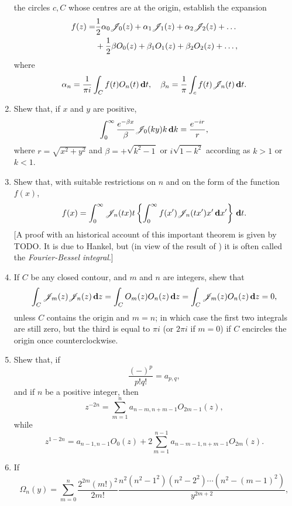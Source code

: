 \begin{enumerate}
  the circles $c,C$ whose centres are at the origin, establish the
  expansion
  \begin{align*}
    f(z)
    =&
    \frac{1}{2} \alpha_{0} \mathscr{J}_{0}(z) + \alpha_{1} \mathscr{J}_{1}(z)
    + \alpha_{2} \mathscr{J}_{2}(z) + \dots
    \\
    &
    + \frac{1}{2} \beta O_{0}(z) + \beta_{1} O_{1}(z) + \beta_{2} O_{2}(z) + \dots,
  \end{align*}
  where
  $$
  \alpha_{n}
  =
  \frac{1}{\pi i}
  \int_{C} f(t) O_{n}(t) \, \mathbf{d} t,
  \quad
  \beta_{n}
  =
  \frac{1}{\pi}
  \int_{c} f(t) \mathscr{J}_{n}(t) \, \mathbf{d} t.
  $$
\item
  Shew that, if $x$ and $y$ are positive,
  $$
  \int_{0}^{\infty}
  \frac{e^{-\beta x}}{\beta}
  \mathscr{J}_{0}(ky)
  k \, \mathbf{d} k
  =
  \frac{e^{-ir}}{r},
  $$
  where $r = \sqrt{x^{2}+y^{2}}$ and
  $\beta = +\sqrt{k^{2} - 1}$
  or
  $i \sqrt{1 - k^{2}}$
  according as $k>1$ or $k<1$.
%
%
\item
  Shew that, with suitable restrictions on $n$ and on the form of the
  function $f(x)$,
  $$
  f(x)
  =
  \int_{0}^{\infty} \mathscr{J}_{n}(tx) t
  \left\{ 
    \int_{0}^{\infty}
    f(x') \mathscr{J}_{n}(tx') x' \, \mathbf{d} x'
   \right\}
  \, \mathbf{d} t.
  $$
  [A proof with an historical account of this important theorem is
  given by TODO. It is due to Hankel, but (in view of the result of
  ) it is often called the \emph{Fourier-Bessel
    integral}.]
\item
  If $C$ be any closed contour, and $m$ and $n$ are integers, shew
  that
  $$
  \int_{C} \mathscr{J}_{m}(z) \mathscr{J}_{n}(z) \, \mathbf{d} z
  =
  \int_{C} O_{m}(z) O_{n}(z) \, \mathbf{d} z
  =
  \int_{C} \mathscr{J}_{m}(z) O_{n}(z) \, \mathbf{d} z
  =
  0,
  $$
  unless $C$ contains the origin and $m=n$; in which case the first
  two integrals are still zero, but the third is equal to $\pi i$ (or
  $2\pi i$ if $m=0$) if $C$ encircles the origin once
  counterclockwise.
\item
  Shew that, if
  $$
  \frac{(-)^{p}}{p!q!} = a_{p,q},
  $$
  and if $n$ be a positive integer, then
  $$
  z^{-2n}
  =
  \sum_{m=1}^{n} a_{n-m,n+m-1} O_{2m-1}(z),
  $$
  while
  $$
  z^{1-2n}
  =
  a_{n-1,n-1} O_{0}(z)
  +
  2 \sum_{m=1}^{n-1} a_{n-m-1,n+m-1} O_{2m}(z).
  $$
\item
  If
  $$
  \Omega_{n}(y)
  =
  \sum_{m=0}^{n}
  \frac{2^{2m} (m!)^{2}}{2m!}
  \frac{n^{2} (n^{2}-1^{2}) (n^{2}-2^{2}) \cdots (n^{2}-(m-1)^{2})}{y^{2m+2}},
$$
\end{enumerate}
